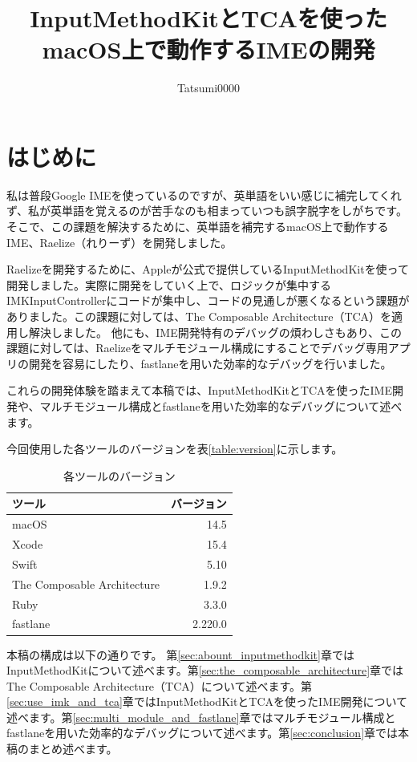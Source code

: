 \documentclass[uplatex,a4j,12pt,twocolumn]{jsarticle}
\begin{document}
\title{InputMethodKitとTCAを使ったmacOS上で動作するIMEの開発}
\author{Tatsumi0000}
\date{}
\maketitle

\section{はじめに}\label{sec:intro}
私は普段Google IMEを使っているのですが、英単語をいい感じに補完してくれず、私が英単語を覚えるのが苦手なのも相まっていつも誤字脱字をしがちです。そこで、この課題を解決するために、英単語を補完するmacOS上で動作するIME、Raelize（れりーず）を開発しました。

Raelizeを開発するために、Appleが公式で提供しているInputMethodKit\cite{bib:about_inputmethodkit}を使って開発しました。実際に開発をしていく上で、ロジックが集中するIMKInputControllerにコードが集中し、コードの見通しが悪くなるという課題がありました。この課題に対しては、The Composable Architecture（TCA）\cite{bib:the_composable_architecture}を適用し解決しました。
他にも、IME開発特有のデバッグの煩わしさもあり、この課題に対しては、Raelizeをマルチモジュール構成にすることでデバッグ専用アプリの開発を容易にしたり、fastlane\cite{bib:fastlane}を用いた効率的なデバッグを行いました。

これらの開発体験を踏まえて本稿では、InputMethodKitとTCAを使ったIME開発や、マルチモジュール構成とfastlaneを用いた効率的なデバッグについて述べます。

今回使用した各ツールのバージョンを表\ref{table:version}に示します。
\begin{table}[h]
  \begin{center}
    \caption{各ツールのバージョン}
    \begin{tabular}{|l|r|} \hline
      ツール & バージョン \\ \hline
      macOS & 14.5 \\
      Xcode & 15.4 \\
      Swift & 5.10 \\
      The Composable Architecture & 1.9.2 \\
      Ruby & 3.3.0\\
      fastlane & 2.220.0 \\ \hline
    \end{tabular}
  \end{center}
\end{table}\label{table:version}

本稿の構成は以下の通りです。
第\ref{sec:abount_inputmethodkit}章ではInputMethodKitについて述べます。第\ref{sec:the_composable_architecture}章ではThe Composable Architecture（TCA）について述べます。第\ref{sec:use_imk_and_tca}章ではInputMethodKitとTCAを使ったIME開発について述べます。第\ref{sec:multi_module_and_fastlane}章ではマルチモジュール構成とfastlaneを用いた効率的なデバッグについて述べます。第\ref{sec:conclusion}章では本稿のまとめ述べます。
\end{document}
